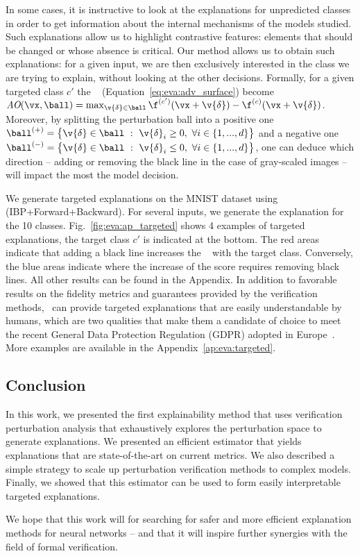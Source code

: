 In some cases, it is instructive to look at the explanations for unpredicted classes in order to get information about the internal mechanisms of the models studied. Such explanations allow us to highlight contrastive features: elements that should be changed or whose absence is critical. 
Our method allows us to obtain such explanations: for a given input, we are then exclusively interested in the class we are trying to explain, without looking at the other decisions. Formally, for a given targeted class $c'$
the \adv~ (Equation~\ref{eq:eva:adv_surface}) become $\AO(\vx, \ball) = \max_{\substack{\v{\delta} \in \ball}} \f^{(c')}(\vx + \v{\delta}) - \f^{(c)}(\vx + \v{\delta})$. Moreover, by splitting the perturbation ball into a positive one $\ball^{(+)} = \big\{ \v{\delta} \in \ball ~:~ \v{\delta}_i \geq 0,~ \forall i \in \{1, ..., d \} \big\}$ and a negative one $\ball^{(-)} = \big\{ \v{\delta} \in \ball ~:~ \v{\delta}_i \leq 0,~ \forall i \in \{1, ..., d \} \big\}$, one can deduce which direction -- adding or removing the black line in the case of gray-scaled images -- will impact the most the model decision.

We generate targeted explanations on the MNIST dataset using (IBP+Forward+Backward). For several inputs, we generate the explanation for the 10 classes. Fig.~\ref{fig:eva:ap_targeted} shows 4 examples of targeted explanations, the target class $c'$ is indicated at the bottom. The red areas indicate that adding a black line increases the \adv~ with the target class. Conversely, the blue areas indicate where the increase of the score requires removing black lines.
All other results can be found in the Appendix.
In addition to favorable results on the fidelity metrics and guarantees provided by the verification methods, \eva~can provide targeted explanations that are easily understandable by humans, which are two qualities that make them a candidate of choice to meet the recent General Data Protection Regulation (GDPR) adopted in Europe~\cite{kaminski2021right}. More examples are available in the Appendix~\ref{ap:eva:targeted}.

\subsection{Conclusion}

In this work, we presented the first explainability method that uses verification perturbation analysis that exhaustively explores the perturbation space to generate explanations. We presented an efficient estimator that yields explanations that are state-of-the-art on current metrics. We also described a simple strategy to scale up perturbation verification methods to complex models. Finally, we showed that this estimator can be used to form easily interpretable targeted explanations.

We hope that this work will %
for searching for safer and more efficient explanation methods for neural networks -- and that it will inspire further synergies with the field of formal verification.
